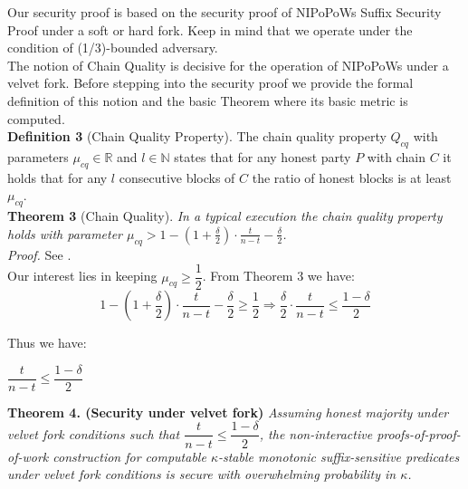 Our security proof is based on the security proof of NIPoPoWs Suffix Security Proof
under a soft or hard fork. Keep in mind that we operate under the condition of
(1/3)-bounded adversary.\\

The notion of Chain Quality is decisive for the operation of NIPoPoWs under a
velvet fork. Before stepping into the security proof we provide the formal
definition of this notion and the basic Theorem where its basic metric is computed.\\

\textbf{Definition 3 }(Chain Quality Property)\cite{Backbone}. The chain quality
property $Q_{cq}$ with parameters $\mu_{cq} \in \mathbb{R}$ and $l \in \mathbb{N}$
states that for any honest party $P$ with chain $C$ it holds that for any
$l $ consecutive blocks of $C$ the ratio of honest blocks is at least $\mu_{cq}$.\\

\textbf{Theorem 3 }(Chain Quality)\cite{Backbone}. \textit{In a typical execution
the chain quality property holds with parameter $\mu_{cq} > 1 - (1 + \frac{\delta}{2})
\cdot \frac{t}{n-t} - \frac{\delta}{2}$.}\\
\textit{Proof.} See \cite{Backbone}.\\

Our interest lies in keeping $\mu_{cq} \geq \dfrac{1}{2}$.
From Theorem 3 we have:
\begin{equation*}
1 - (1 + \frac{\delta}{2}) \cdot \frac{t}{n-t} - \frac{\delta}{2} \geq \dfrac{1}{2} \Rightarrow 
\frac{\delta}{2} \cdot \frac{t}{n-t} \leq \frac{1-\delta}{2}
\end{equation*}

Thus we have:
\begin{center}
$  \dfrac{t}{n-t} \leq \dfrac{1-\delta}{2} $
\end{center}

\textbf{Theorem 4. (Security under velvet fork)} \textit{Assuming honest majority
under velvet fork conditions such that $\dfrac{t}{n-t} \leq \dfrac{1-\delta}{2}$,
the non-interactive proofs-of-proof-of-work construction for computable
$\kappa$-stable monotonic suffix-sensitive predicates under velvet fork conditions
is secure with overwhelming probability in $\kappa$.}\\

